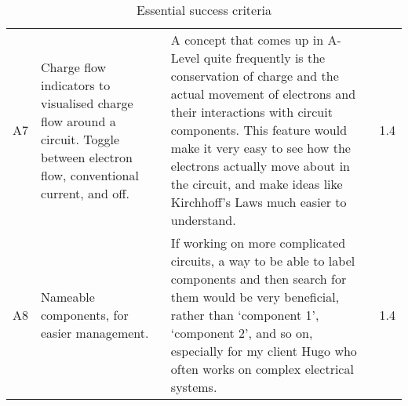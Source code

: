 \begin{table}[!ht]
\begin{tabular}{@{}lp{185pt}p{200pt}l@{}}
        A7 & Charge flow indicators to visualised charge flow around a circuit. Toggle between electron flow, conventional current, and off. & A concept that comes up in A-Level quite frequently is the conservation of charge and the actual movement of electrons and their interactions with circuit components. This feature would make it very easy to see how the electrons actually move about in the circuit, and make ideas like Kirchhoff's Laws much easier to understand. & 1.4 \\ \medskip
        A8 & Nameable components, for easier management. & If working on more complicated circuits, a way to be able to label components and then search for them would be very beneficial, rather than `component 1', `component 2', and so on, especially for my client Hugo who often works on complex electrical systems. & 1.4 \\
        \bottomrule
    \end{tabular}
    \caption{Essential success criteria}
    \label{tbl:essential_succ_crit}
\end{table}


